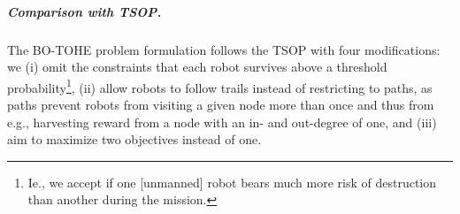 \documentclass[11pt, oneside]{article}
\begin{document}
%
%


\subparagraph{Comparison with TSOP.}
The BO-TOHE problem formulation follows the TSOP \cite{jorgensen2018team} with four modifications: we 
(i) omit the constraints that each robot survives above a threshold probability\footnote{Ie., we accept if one [unmanned] robot bears much more risk of destruction than another during the mission.},
(ii) allow robots to follow trails instead of restricting to paths, as paths prevent robots from visiting a given node more than once and thus from e.g., harvesting reward from a node with an in- and out-degree of one, 
and
(iii) aim to maximize two objectives instead of one.
\end{document}
